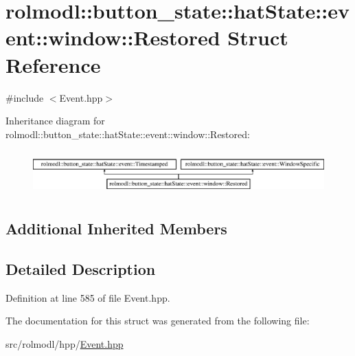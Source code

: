 \hypertarget{structrolmodl_1_1button__state_1_1hat_state_1_1event_1_1window_1_1_restored}{}\section{rolmodl\+::button\+\_\+state\+::hat\+State\+::event\+::window\+::Restored Struct Reference}
\label{structrolmodl_1_1button__state_1_1hat_state_1_1event_1_1window_1_1_restored}


{\ttfamily \#include $<$Event.\+hpp$>$}

Inheritance diagram for rolmodl\+::button\+\_\+state\+::hat\+State\+::event\+::window\+::Restored\+:\begin{figure}[H]
\begin{center}
\leavevmode
\includegraphics[height=1.717791cm]{structrolmodl_1_1button__state_1_1hat_state_1_1event_1_1window_1_1_restored}
\end{center}
\end{figure}
\subsection*{Additional Inherited Members}


\subsection{Detailed Description}


Definition at line 585 of file Event.\+hpp.



The documentation for this struct was generated from the following file\+:\begin{DoxyCompactItemize}
\item 
src/rolmodl/hpp/\mbox{\hyperlink{_event_8hpp}{Event.\+hpp}}\end{DoxyCompactItemize}
